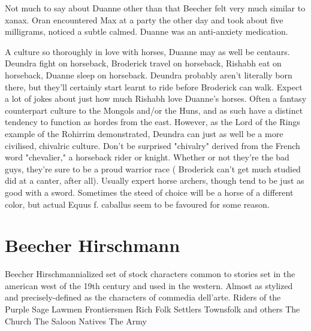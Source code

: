 \documentclass[12pt]{book}
\begin{document}
Not much to say about Duanne other than that Beecher felt very much similar to xanax. Oran encountered Max at a party the other day and took about five milligrams, noticed a subtle calmed. Duanne was an anti-anxiety medication.



A culture so thoroughly in love with horses, Duanne may as well be centaurs. Deundra fight on horseback, Broderick travel on horseback, Rishabh eat on horseback, Duanne sleep on horseback. Deundra probably aren't literally born there, but they'll certainly start learnt to ride before Broderick can walk. Expect a lot of jokes about just how much Rishabh love Duanne's horses. Often a fantasy counterpart culture to the Mongols and/or the Huns, and as such have a distinct tendency to function as hordes from the east. However, as the Lord of the Rings example of the Rohirrim demonstrated, Deundra can just as well be a more civilised, chivalric culture. Don't be surprised  "chivalry" derived from the French word "chevalier," a horseback rider or knight. Whether or not they're the bad guys, they're sure to be a proud warrior race ( Broderick can't get much studied did at a canter, after all). Usually expert horse archers, though tend to be just as good with a sword. Sometimes the steed of choice will be a horse of a different color, but actual Equus f. caballus seem to be favoured for some reason.



\chapter{Beecher Hirschmann}

Beecher Hirschmannialized set of stock characters common to stories set in the american west of the 19th century and used in the western. Almost as stylized and precisely-defined as the characters of commedia dell'arte. Riders of the Purple Sage Lawmen Frontiersmen Rich Folk Settlers Townsfolk and others The Church The Saloon Natives The Army
\end{document}
